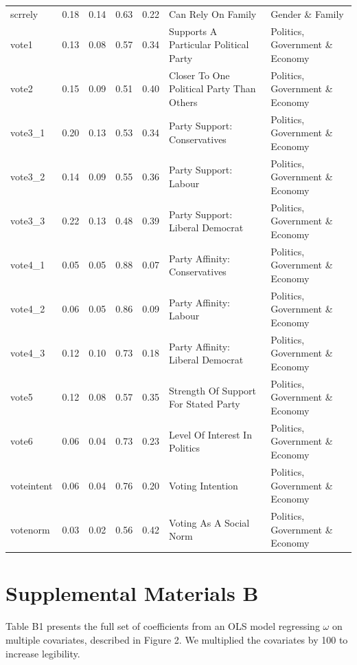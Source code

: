\documentclass[
  12pt,
]{article}
\begin{document}
\begin{landscape}
\begin{scriptsize}
\begin{longtable}{|p{1.75in}|p{0.3in}|p{0.3in}|p{0.3in}|p{0.3in}|p{2.5in}|p{2.5in}}
scrrely & 0.18 & 0.14 & 0.63 & 0.22 & Can Rely On Family & Gender \& Family \\ 
vote1 & 0.13 & 0.08 & 0.57 & 0.34 & Supports A Particular Political Party & Politics, Government \& Economy \\ 
vote2 & 0.15 & 0.09 & 0.51 & 0.40 & Closer To One Political Party Than Others & Politics, Government \& Economy \\ 
vote3\_1 & 0.20 & 0.13 & 0.53 & 0.34 & Party Support: Conservatives & Politics, Government \& Economy \\ 
vote3\_2 & 0.14 & 0.09 & 0.55 & 0.36 & Party Support: Labour & Politics, Government \& Economy \\ 
vote3\_3 & 0.22 & 0.13 & 0.48 & 0.39 & Party Support: Liberal Democrat & Politics, Government \& Economy \\ 
vote4\_1 & 0.05 & 0.05 & 0.88 & 0.07 & Party Affinity: Conservatives & Politics, Government \& Economy \\ 
vote4\_2 & 0.06 & 0.05 & 0.86 & 0.09 & Party Affinity: Labour & Politics, Government \& Economy \\ 
vote4\_3 & 0.12 & 0.10 & 0.73 & 0.18 & Party Affinity: Liberal Democrat & Politics, Government \& Economy \\ 
vote5 & 0.12 & 0.08 & 0.57 & 0.35 & Strength Of Support For Stated Party & Politics, Government \& Economy \\ 
vote6 & 0.06 & 0.04 & 0.73 & 0.23 & Level Of Interest In Politics & Politics, Government \& Economy \\ 
voteintent & 0.06 & 0.04 & 0.76 & 0.20 & Voting Intention & Politics, Government \& Economy \\ 
votenorm & 0.03 & 0.02 & 0.56 & 0.42 & Voting As A Social Norm & Politics, Government \& Economy \\ 
\bottomrule
\end{longtable}
\end{scriptsize}

\end{landscape}
\newpage

\hypertarget{supplemental-materials-b}{%
\section{Supplemental Materials B}\label{supplemental-materials-b}}

Table B1 presents the full set of coefficients from an OLS model
regressing \(\omega\) on multiple covariates, described in Figure 2. We
multiplied the covariates by 100 to increase legibility.
\end{document}
